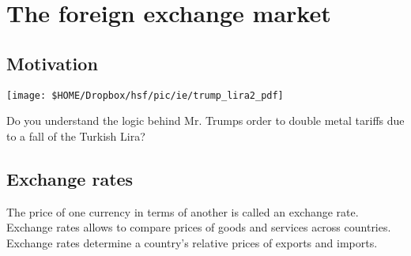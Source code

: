 	


\pbn
\section{The foreign exchange market}\label{sec:The foreign exchange market}


\pbn
\subsection{Motivation}
\begin{center}
	\texttt{[image: \$HOME/Dropbox/hsf/pic/ie/trump\_lira2\_pdf]}
	\label{fig:trump_lira}
\end{center} 

Do you understand the logic behind Mr. Trumps order to double metal tariffs due to a fall of the Turkish Lira?

\pbn
\subsection{Exchange rates}\label{sec:Exchange rates}
The price of one currency in terms of another is called an exchange rate. Exchange rates allows to compare prices of goods and services across countries. Exchange rates determine a country's relative prices of exports and imports.

